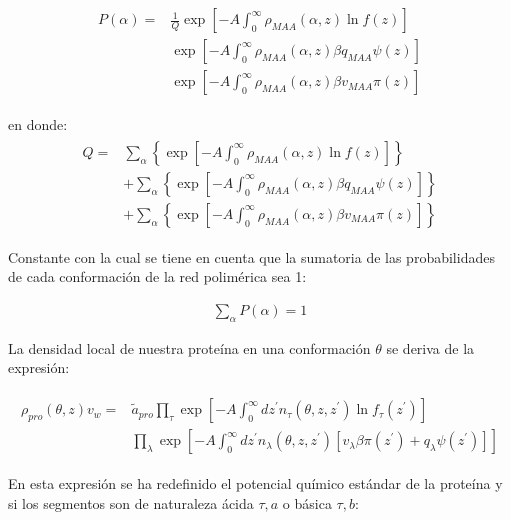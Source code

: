 \begin{align}
	\begin{aligned}
	P(\alpha) = &\frac{1}{Q}\exp\left[ -A \int^\infty_0 \rho_{MAA}(\alpha, z) \ln f(z)\right] \\
	&\exp\left[ -A \int^\infty_0 \rho_{MAA}(\alpha, z) \beta q_{MAA} \psi(z)\right] \\
	& \exp\left[ -A \int^\infty_0 \rho_{MAA}(\alpha, z) \beta v_{MAA} \pi(z)\right] 
	\end{aligned}
	\label{eq:film:probabilidad}
\end{align}

\noindent en donde:
\begin{align}
	\begin{aligned}
		Q = &\sum_\alpha \left\{ \exp\left[ -A \int^\infty_0 \rho_{MAA}(\alpha, z) \ln f(z)\right]\right\} \\
		& + \sum_\alpha\left\{ \exp\left[ -A \int^\infty_0 \rho_{MAA}(\alpha, z) \beta q_{MAA} \psi(z)\right]  \right\} \\
		& + \sum_\alpha\left\{ \exp\left[ -A \int^\infty_0 \rho_{MAA}(\alpha, z) \beta v_{MAA} \pi(z)\right]  \right\} 
	\end{aligned}
\end{align}

Constante con la cual se tiene en cuenta que la sumatoria de las probabilidades de cada conformaci\'on de la red polim\'erica sea 1:

\begin{align}
	\sum_\alpha P(\alpha) = 1                 
\end{align}

La densidad local de nuestra prote\'ina en una conformaci\'on $\theta$ se deriva de la expresi\'on:

\begin{align}
	\begin{aligned}
	\rho_{pro}(\theta, z)v_w = &\tilde{a}_{pro} \prod_\tau\exp\left[-A\int_0^\infty dz^\prime n_\tau(\theta,z,z^\prime) \ln f_\tau(z^\prime)\right] \\
	& \prod_\lambda \exp \left[-A\int^\infty_0 dz^\prime n_\lambda(\theta,z, z^\prime)[v_\lambda\beta\pi(z^\prime) + q_\lambda \psi(z^\prime)] \right]
	\end{aligned}
\label{eq:film:proteina}
\end{align}

En esta expresi\'on se ha redefinido el potencial qu\'imico est\'andar de la prote\'ina y si los segmentos son de naturaleza \'acida $\tau, a$ o b\'asica $\tau,b$:

